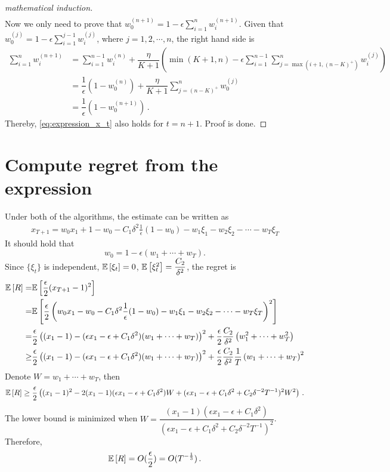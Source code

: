 \documentclass[11pt,letterpaper,english]{article}
\begin{document}
\begin{proof}[mathematical induction]
\begin{align*}
\end{align*}
Now we only need to prove that $w^{(n+1)}_0=1-\epsilon \sum_{i=1}^n w^{(n+1)}_i$. Given that $w^{(j)}_0=1-\epsilon \sum_{i=1}^{j-1} w^{(j)}_i$, where $j=1,2,\cdots,n$, the right hand side is
\begin{align*}
 \sum_{i=1}^n w^{(n+1)}_i
&=  \sum_{i=1}^{n-1} w^{(n)}_i +\dfrac{\eta}{K+1} \left( \min\left(K+1,n \right) -\epsilon  \sum_{i=1}^{n-1} \sum_{j=\max \left(i+1,(n-K)^+\right)}^n w^{(j)}_i \right) \\
&= \dfrac{1}{\epsilon} \left( 1-w^{(n)}_0 \right) + \dfrac{\eta}{K+1}  \sum_{j=(n-K)^+}^n w^{(j)}_0  \\
&=  \dfrac{1}{\epsilon} \left( 1-w^{(n+1)}_0 \right) \,.
\end{align*}
Thereby, \ref{eq:expression_x_t} also holds for $t=n+1$. Proof is done.

\end{proof}

\section{Compute regret from the expression}
Under both of the algorithms, the estimate can be written as
\begin{align*}
x_{T+1} = w_0 x_1 + 1-w_0 -C_1 \delta^2 \frac{1}{\epsilon}(1-w_0) -w_1 \xi_1 - w_2 \xi_2 - \cdots - w_T \xi_T
\end{align*}
It should hold that 
\[w_0 = 1-\epsilon (w_1+\cdots+w_T).\]
Since $\{\xi_t\}$ is independent, $\mathbb{E}\left[\xi_t\right]=0$, $\mathbb{E}\left[\xi_t^2\right]=\dfrac{C_2}{\delta^2}$, 
the regret is
\begin{align*}
\mathbb{E}\left[R\right] =&\mathbb{E}\left[ \frac{\epsilon}{2} (x_{T+1}-1)^2\right]\\
=& \mathbb{E}\left[\frac{\epsilon}{2} \left(w_0 x_1 -w_0 -C_1 \delta^2 \frac{1}{\epsilon}(1-w_0) -w_1 \xi_1 - w_2 \xi_2 - \cdots - w_T \xi_T  \right)^2\right] \\
=& \dfrac{\epsilon}{2} \left( (x_1-1)-(\epsilon x_1 -\epsilon +C_1\delta^2)(w_1+\cdots+w_T) \right)^2 + \dfrac{\epsilon}{2} \dfrac{C_2}{\delta^2} \left(w_1^2+\cdots+w_T^2  \right) \\
\geq& \dfrac{\epsilon}{2} \left( (x_1-1)-(\epsilon x_1 -\epsilon +C_1\delta^2)(w_1+\cdots+w_T) \right)^2 + \dfrac{\epsilon}{2} \dfrac{C_2}{\delta^2}\dfrac{1}{T} \left(w_1+\cdots+w_T  \right)^2
\end{align*}
Denote $W = w_1+\cdots+w_T$, then 
\begin{align*}
\mathbb{E}\left[R\right] \geq  \dfrac{\epsilon}{2} \left( (x_1-1)^2-2(x_1-1)(\epsilon x_1-\epsilon +C_1 \delta^2)W + (\epsilon x_1-\epsilon +C_1 \delta^2+C_2 \delta^{-2}T^{-1})^2W^2  \right) \,.
\end{align*}
The lower bound is minimized when $W=\dfrac{(x_1-1)(\epsilon x_1-\epsilon +C_1 \delta^2)}{\left(\epsilon x_1-\epsilon +C_1 \delta^2+C_2 \delta^{-2}T^{-1}\right)^2} $. Therefore, 
\begin{align*}
\mathbb{E}\left[R\right] = O(\dfrac{\epsilon}{2}) = O(T^{-\frac{1}{3}})\,.
\end{align*}
\end{document}
